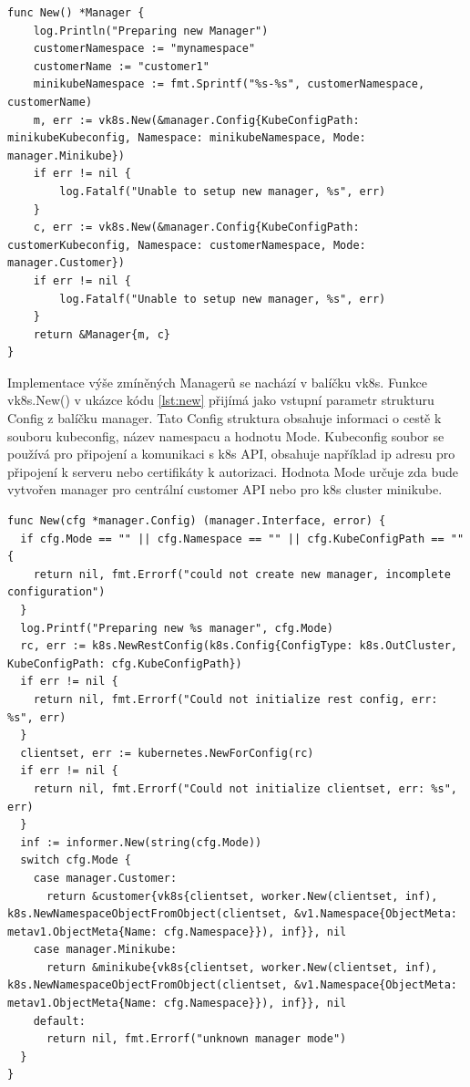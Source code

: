 \begin{lstlisting}[caption={funkce vytvoření nového managera},label=lst:cluster]
func New() *Manager {
	log.Println("Preparing new Manager")
	customerNamespace := "mynamespace"
	customerName := "customer1"
	minikubeNamespace := fmt.Sprintf("%s-%s", customerNamespace, customerName)
	m, err := vk8s.New(&manager.Config{KubeConfigPath: minikubeKubeconfig, Namespace: minikubeNamespace, Mode: manager.Minikube})
	if err != nil {
		log.Fatalf("Unable to setup new manager, %s", err)
	}
	c, err := vk8s.New(&manager.Config{KubeConfigPath: customerKubeconfig, Namespace: customerNamespace, Mode: manager.Customer})
	if err != nil {
		log.Fatalf("Unable to setup new manager, %s", err)
	}
	return &Manager{m, c}
}
\end{lstlisting}
\par
											Implementace výše zmíněných Managerů se nachází v balíčku vk8s. Funkce \linebreak vk8s.New() v ukázce kódu \ref{lst:new} přijímá jako vstupní parametr strukturu Config z balíčku manager. Tato Config struktura obsahuje informaci o cestě k souboru kubeconfig, název namespacu a hodnotu Mode. Kubeconfig soubor se používá pro připojení a komunikaci s k8s API, obsahuje například ip adresu pro připojení k serveru nebo certifikáty k autorizaci. Hodnota Mode určuje zda bude vytvořen manager pro centrální customer API nebo pro k8s cluster minikube.\par 
\begin{lstlisting}[caption={vk8s.New() funkce pro vytvoření customer a minikube managera},label=lst:new]
func New(cfg *manager.Config) (manager.Interface, error) {
  if cfg.Mode == "" || cfg.Namespace == "" || cfg.KubeConfigPath == "" {
    return nil, fmt.Errorf("could not create new manager, incomplete configuration")
  }
  log.Printf("Preparing new %s manager", cfg.Mode)
  rc, err := k8s.NewRestConfig(k8s.Config{ConfigType: k8s.OutCluster, KubeConfigPath: cfg.KubeConfigPath})
  if err != nil {
    return nil, fmt.Errorf("Could not initialize rest config, err: %s", err)
  }
  clientset, err := kubernetes.NewForConfig(rc)
  if err != nil {
    return nil, fmt.Errorf("Could not initialize clientset, err: %s", err)
  }
  inf := informer.New(string(cfg.Mode))
  switch cfg.Mode {
    case manager.Customer:
      return &customer{vk8s{clientset, worker.New(clientset, inf), k8s.NewNamespaceObjectFromObject(clientset, &v1.Namespace{ObjectMeta: metav1.ObjectMeta{Name: cfg.Namespace}}), inf}}, nil
    case manager.Minikube:
      return &minikube{vk8s{clientset, worker.New(clientset, inf), k8s.NewNamespaceObjectFromObject(clientset, &v1.Namespace{ObjectMeta: metav1.ObjectMeta{Name: cfg.Namespace}}), inf}}, nil
    default:
      return nil, fmt.Errorf("unknown manager mode")
  }
}
\end{lstlisting}

